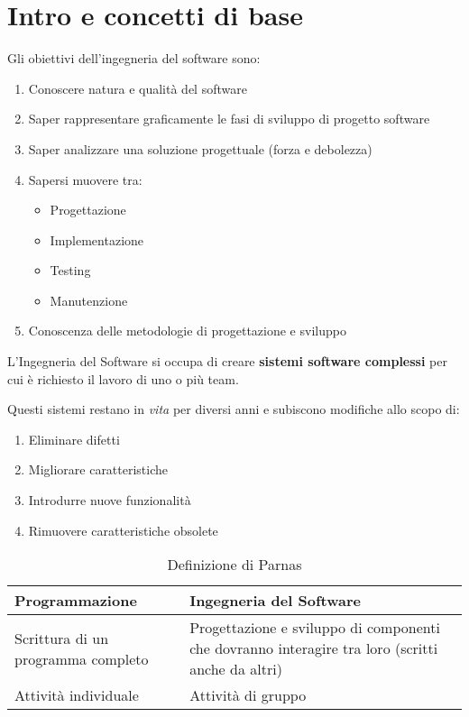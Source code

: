 \chapter{Intro e concetti di base}

Gli obiettivi dell'ingegneria del software sono:
\begin{enumerate}
    \item Conoscere natura e qualità del software
    \item Saper rappresentare graficamente le fasi di sviluppo di progetto software
    \item Saper analizzare una soluzione progettuale (forza e debolezza)
    \item Sapersi muovere tra:
    \begin{itemize}
        \item Progettazione
        \item Implementazione
        \item Testing
        \item Manutenzione
    \end{itemize}
    \item Conoscenza delle metodologie di progettazione e sviluppo
\end{enumerate}

L'Ingegneria del Software si occupa di creare \textbf{sistemi software complessi} per cui è richiesto il lavoro di uno o più team.

Questi sistemi restano in \textit{vita} per diversi anni e subiscono modifiche allo scopo di:
\begin{enumerate}
    \item Eliminare difetti
    \item Migliorare caratteristiche
    \item Introdurre nuove funzionalità
    \item Rimuovere caratteristiche obsolete
\end{enumerate}

\begin{table}[h!]
    \centering
    \begin{tabularx}{\textwidth}{|X|X|}
        \hline
        \textbf{Programmazione} & \textbf{Ingegneria del Software} \\
        \hline
        Scrittura di un programma completo & Progettazione e sviluppo di componenti che dovranno interagire tra loro (scritti anche da altri) \\
        \hline
        Attività individuale & Attività di gruppo \\
        \hline
    \end{tabularx}
    \caption{Definizione di Parnas}
\end{table}

